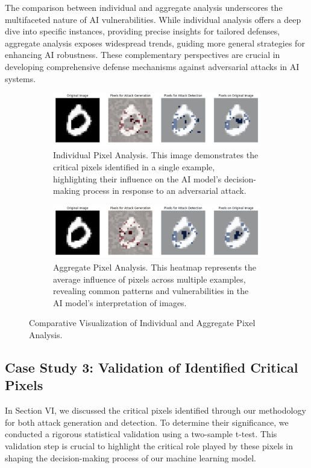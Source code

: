 \documentclass[10pt, conference, a4paper, final]{IEEEtran}
\begin{document}
  The comparison between individual and aggregate analysis underscores the multifaceted nature of AI vulnerabilities. While individual analysis offers a deep dive into specific instances, providing precise insights for tailored defenses, aggregate analysis exposes widespread trends, guiding more general strategies for enhancing AI robustness. These complementary perspectives are crucial in developing comprehensive defense mechanisms against adversarial attacks in AI systems.
  \begin{figure}[h]
    \centering
    \begin{subfigure}{.45\textwidth}
        \centering
        \includegraphics[width=\linewidth]{paper_images/individual.png}
        \caption{Individual Pixel Analysis. This image demonstrates the critical pixels identified in a single example, highlighting their influence on the AI model's decision-making process in response to an adversarial attack.}
        \label{fig:individual_analysis}
    \end{subfigure}
    \par\medskip %
    \begin{subfigure}{.45\textwidth}
        \centering
        \includegraphics[width=\linewidth]{paper_images/aggregate.png}
        \caption{Aggregate Pixel Analysis. This heatmap represents the average influence of pixels across multiple examples, revealing common patterns and vulnerabilities in the AI model's interpretation of images.}
        \label{fig:aggregate_analysis}
    \end{subfigure}
    \caption{Comparative Visualization of Individual and Aggregate Pixel Analysis.}
    \label{fig:pixel_analysis}
\end{figure}

  \subsection{Case Study 3: Validation of Identified Critical Pixels}
    In Section VI, we discussed the critical pixels identified through our methodology for both attack generation and detection. To determine their significance, we conducted a rigorous statistical validation using a two-sample t-test. This validation step is crucial to highlight the critical role played by these pixels in shaping the decision-making process of our machine learning model.
\end{document}
